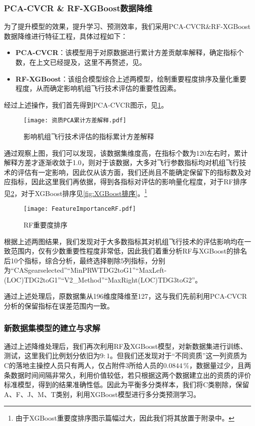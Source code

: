 \documentclass{MathorCupModeling}
\begin{document}
	\subsubsection{PCA-CVCR \& RF-XGBoost数据降维}
	为了提升模型的效果，提升学习、预测效率，我们采用PCA-CVCR\&RF-XGBoost数据降维进行特征工程，具体过程如下：
	\begin{itemize}
		\item \textbf{PCA-CVCR}：该模型用于对原数据进行累计方差贡献率解释，确定指标个数，在上文已经提及，这里不再赘述，见\textcolor{blue}{}。
		\item \textbf{RF-XGBoost}：该组合模型综合上述两模型，绘制重要程度排序及量化重要程度，从而确定影响机组飞行技术评估的重要性因素。
	\end{itemize}
	经过上述操作，我们首先得到PCA-CVCR图示，见\textcolor{blue}{\cref{fig:附件3累计方差解释}}。
	\begin{figure}[H]
		\centering
		\texttt{[image: 资质PCA累计方差解释.pdf]}
		\caption{影响机组飞行技术评估的指标累计方差解释}
		\label{fig:附件3累计方差解释}
	\end{figure}

	通过观察上图，我们可以发现，该数据集维度高，在指标个数为120左右时，累计解释方差才逐渐收敛于1.0，则对于该数据，大多对飞行参数指标均对机组飞行技术的评估有一定影响，因此仅从该方面，我们还尚且不能确定保留下的指标数及对应指标，因此这里我们再依据\textcolor{blue}{}，得到各指标对评估的影响量化程度，对于RF排序见\textcolor{blue}{\cref{fig:RF排序}}，对于XGBoost排序见\textcolor{blue}{\cref{fig:XGBoost排序}}。\textcolor{blue}{\footnote{由于XGBoost重要度排序图示篇幅过大，因此我们将其放置于附录中。}}
	\begin{figure}[H]
		\centering
		\texttt{[image: FeatureImportanceRF.pdf]}
		\caption{RF重要度排序}
		\label{fig:RF排序}
	\end{figure}

	根据上述两图结果，我们发现对于大多数指标其对机组飞行技术的评估影响均在一致范围内，仅有少数重要性程度非常低，因此我们着重分析RF与XGBoost的排名后10个指标，综合分析，最终选择剔除5列指标，分别为“CASgearselected”“MinPRWTDG2toG1”“MaxLeft-\\(LOC)TDG2toG1”“V2\_Method”“MaxRight(LOC)TDG3toG2”。

	通过上述处理后，原数据集从196维度降维至127，这与我们先前利用PCA-CVCR分析的保留指标在误差范围内一致。

	\subsubsection{新数据集模型的建立与求解}
	通过上述降维处理后，我们再次利用RF及XGBoost模型，对新数据集进行训练、测试，这里我们比例划分依旧为$9:1$。但我们还发现对于“不同资质”这一列资质为C的落地主操控人员只有两人，仅占附件3所给人员的$0.0844\,\%$，数据量过少，且两条数据时间间隔非常久，利用价值较低，若只根据这两个数据建立出的资质的评价标准模型，得到的结果准确性低。因此为平衡多分类样本，我们将C类剔除，保留A、F、J、M、T类别，利用XGBoost模型进行多分类预测学习。
\end{document}
